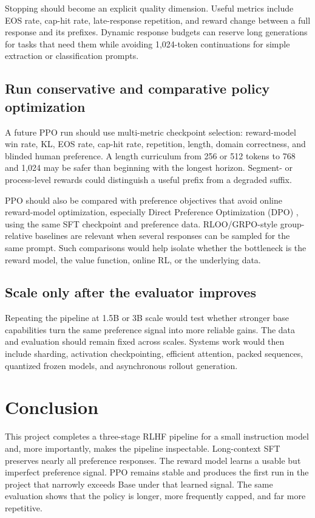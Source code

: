 \documentclass[11pt]{article}
\begin{document}
Stopping should become an explicit quality dimension. Useful metrics include
EOS rate, cap-hit rate, late-response repetition, and reward change between a
full response and its prefixes. Dynamic response budgets can reserve long
generations for tasks that need them while avoiding 1,024-token continuations
for simple extraction or classification prompts.

\subsection{Run conservative and comparative policy optimization}

A future PPO run should use multi-metric checkpoint selection: reward-model
win rate, KL, EOS rate, cap-hit rate, repetition, length, domain correctness,
and blinded human preference. A length curriculum from 256 or 512 tokens to
768 and 1,024 may be safer than beginning with the longest horizon. Segment-
or process-level rewards could distinguish a useful prefix from a degraded
suffix.

PPO should also be compared with preference objectives that avoid online
reward-model optimization, especially Direct Preference Optimization (DPO)
\cite{rafailov2023}, using the same SFT checkpoint and preference data.
RLOO/GRPO-style group-relative baselines are relevant when several responses
can be sampled for the same prompt. Such comparisons would help isolate
whether the bottleneck is the reward model, the value function, online RL, or
the underlying data.

\subsection{Scale only after the evaluator improves}

Repeating the pipeline at 1.5B or 3B scale would test whether stronger base
capabilities turn the same preference signal into more reliable gains. The
data and evaluation should remain fixed across scales. Systems work would then
include sharding, activation checkpointing, efficient attention, packed
sequences, quantized frozen models, and asynchronous rollout generation.

\section{Conclusion}

This project completes a three-stage RLHF pipeline for a small instruction
model and, more importantly, makes the pipeline inspectable. Long-context SFT
preserves nearly all preference responses. The reward model learns a usable
but imperfect preference signal. PPO remains stable and produces the first
run in the project that narrowly exceeds Base under that learned signal. The
same evaluation shows that the policy is longer, more frequently capped, and
far more repetitive.
\end{document}
